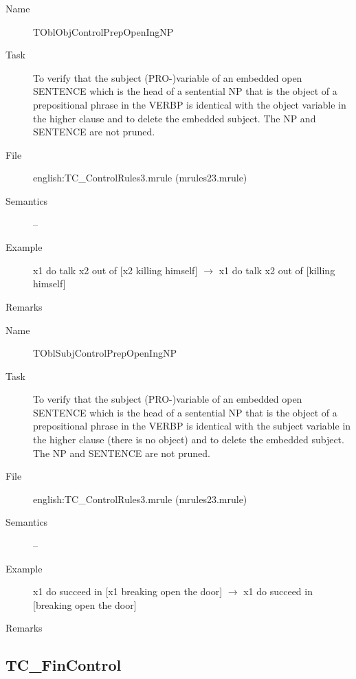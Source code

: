 \begin{description}
\vspace{1 cm}
\begin{description}
\item[Name] TOblObjControlPrepOpenIngNP
\item[Task] To verify that  the subject (PRO-)variable of an embedded 
open SENTENCE which is the head of a sentential NP that is the object of a 
prepositional phrase in the VERBP is identical with the object variable in the 
higher clause 
and to delete the embedded subject. The NP and SENTENCE are not pruned.
\item[File] english:TC\_ControlRules3.mrule (mrules23.mrule)
\item[Semantics] --
\item[Example] x1 do talk x2 out of [x2 killing himself] $\rightarrow$ x1 do 
talk x2 out of [killing himself] 
\item[Remarks] 
\end{description}

\vspace{1 cm}
\begin{description}
\item[Name]   TOblSubjControlPrepOpenIngNP
\item[Task] To verify that  the subject (PRO-)variable of an embedded 
open SENTENCE which is the head of a sentential NP that is the object of a 
prepositional phrase in the VERBP is identical with the subject variable in the 
higher clause (there is no object)
and to delete the embedded subject. The NP and SENTENCE are not pruned.
\item[File] english:TC\_ControlRules3.mrule (mrules23.mrule)
\item[Semantics] --
\item[Example] x1 do succeed in [x1 breaking open the door] $\rightarrow$ x1 do 
succeed in [breaking open the door]
\item[Remarks] 
\end{description}

\end{description}

\newpage
\subsection{TC\_FinControl}

